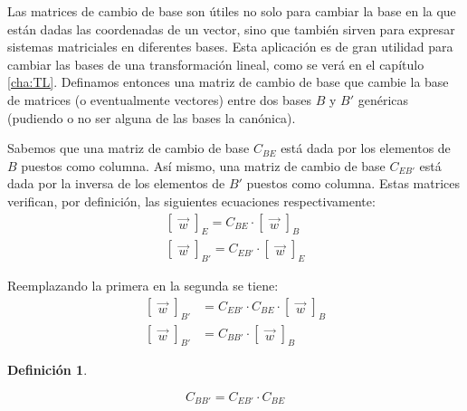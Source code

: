 \documentclass[a5paper,12pt,twoside]{book}
\newtheorem{defn}{{Definición}}[chapter]
\begin{document}
Las  matrices de cambio de base son útiles no solo para cambiar la base en la que están dadas las coordenadas de un vector, sino que también sirven para expresar sistemas matriciales en diferentes bases.
Esta aplicación es de gran utilidad para cambiar las bases de una transformación lineal, como se verá en el capítulo \ref{cha:TL}.
Definamos entonces una matriz de cambio de base que cambie la base de matrices (o eventualmente vectores) entre dos bases $B$ y $B'$ genéricas (pudiendo o no ser alguna de las bases la canónica).

Sabemos que una matriz de cambio de base $C_{BE}$ está dada por los elementos de $B$ puestos como columna.
Así mismo, una matriz de cambio de base $C_{EB'}$ está dada por la inversa de los elementos de $B'$ puestos como columna.
Estas matrices verifican, por definición, las siguientes ecuaciones respectivamente:
\begin{gather*}
    \begin{bmatrix}
        \Vec{w}
    \end{bmatrix}_E
    = C_{BE} \cdot
    \begin{bmatrix}
        \Vec{w}
    \end{bmatrix}_B
    \\[1ex]
    \begin{bmatrix}
        \Vec{w}
    \end{bmatrix}_{B'}
    = C_{EB'} \cdot
    \begin{bmatrix}
        \Vec{w}
    \end{bmatrix}_E
\end{gather*}

Reemplazando la primera en la segunda se tiene:
\begin{align*}
    \begin{bmatrix}
        \Vec{w}
    \end{bmatrix}_{B'}
    &= C_{EB'} \cdot C_{BE} \cdot
    \begin{bmatrix}
        \Vec{w}
    \end{bmatrix}_B
    \\[1ex]
    \begin{bmatrix}
        \Vec{w}
    \end{bmatrix}_{B'}
    &= C_{BB'} \cdot
    \begin{bmatrix}
        \Vec{w}
    \end{bmatrix}_B
\end{align*}

\begin{mdframed}[style=DefinitionFrame]
    \begin{defn}
        \label{defn:C_BB'}
    \end{defn}
    \begin{equation*}
        C_{BB'} = C_{EB'} \cdot C_{BE}
    \end{equation*}
\end{mdframed}
\end{document}
